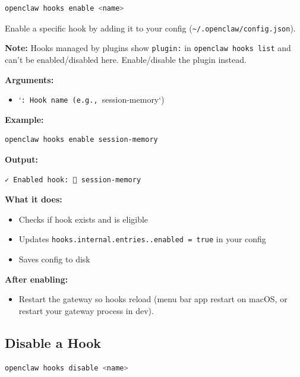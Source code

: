\begin{lstlisting}[language=bash]
openclaw hooks enable <name>
\end{lstlisting}


Enable a specific hook by adding it to your config (\texttt{\textasciitilde{}/.openclaw/config.json}).

\textbf{Note:} Hooks managed by plugins show \texttt{plugin:} in \texttt{openclaw hooks list} and
can’t be enabled/disabled here. Enable/disable the plugin instead.

\textbf{Arguments:}

\begin{itemize}
  \item `\texttt{: Hook name (e.g., }session-memory`)
\end{itemize}


\textbf{Example:}

\begin{lstlisting}[language=bash]
openclaw hooks enable session-memory
\end{lstlisting}


\textbf{Output:}

\begin{lstlisting}
✓ Enabled hook: 💾 session-memory
\end{lstlisting}


\textbf{What it does:}

\begin{itemize}
  \item Checks if hook exists and is eligible
  \item Updates \texttt{hooks.internal.entries..enabled = true} in your config
  \item Saves config to disk
\end{itemize}


\textbf{After enabling:}

\begin{itemize}
  \item Restart the gateway so hooks reload (menu bar app restart on macOS, or restart your gateway process in dev).
\end{itemize}


\subsection{Disable a Hook}


\begin{lstlisting}[language=bash]
openclaw hooks disable <name>
\end{lstlisting}


